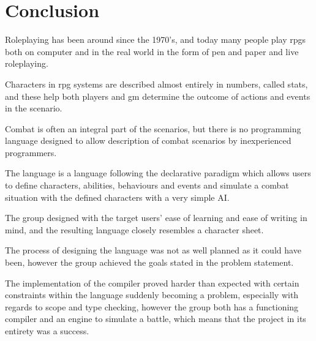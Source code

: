 \chapter{Conclusion}
Roleplaying has been around since the 1970's, and today many people play \ac{rpgs} both on computer and in the real world in the form of pen and paper and live roleplaying.

Characters in \ac{rpg} systems are described almost entirely in numbers, called stats, and these help both players and \ac{gm} determine the outcome of actions and events in the scenario. 

Combat is often an integral part of the scenarios, but there is no programming language designed to allow description of combat scenarios by inexperienced programmers.

The language \langname{} is a language following the declarative paradigm which allows users to define characters, abilities, behaviours and events and simulate a combat situation with the defined characters with a very simple AI.

The group designed \langname{} with the target users' ease of learning and ease of writing in mind, and the resulting language closely resembles a character sheet. 

The process of designing the language was not as well planned as it could have been, however the group achieved the goals stated in the problem statement.

The implementation of the compiler proved harder than expected with certain constraints within the language suddenly becoming a problem, especially with regards to scope and type checking, however the group both has a functioning compiler and an engine to simulate a battle, which means that the project in its entirety was a success.